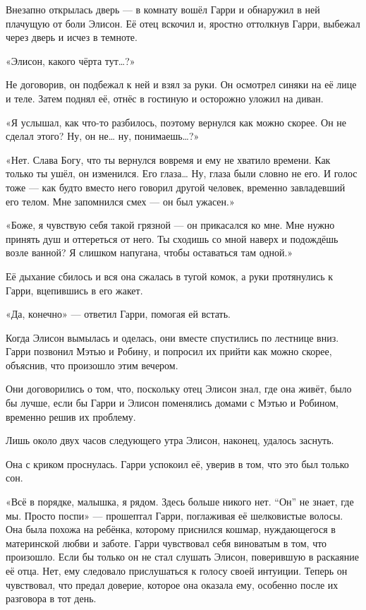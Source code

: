 \documentclass[a5paper, 9pt,
final, openany, twoside=true]{memoir}
\begin{document}
Внезапно открылась дверь — в комнату вошёл Гарри и обнаружил в ней плачущую от боли Элисон. Её отец вскочил и, яростно оттолкнув Гарри, выбежал через дверь и исчез в темноте.

«Элисон, какого чёрта тут…?»

Не договорив, он подбежал к ней и взял за руки. Он осмотрел синяки на её лице и теле. Затем поднял её, отнёс в гостиную и осторожно уложил на диван.

«Я услышал, как что-то разбилось, поэтому вернулся как можно скорее. Он не сделал этого? Ну, он не… ну, понимаешь…?»

«Нет. Слава Богу, что ты вернулся вовремя и ему не хватило времени. Как только ты ушёл, он изменился. Его глаза… Ну, глаза были словно не его. И голос тоже — как будто вместо него говорил другой человек, временно завладевший его телом. Мне запомнился смех — он был ужасен.»

«Боже, я чувствую себя такой грязной — он прикасался ко мне. Мне нужно принять душ и оттереться от него. Ты сходишь со мной наверх и подождёшь возле ванной? Я слишком напугана, чтобы оставаться там одной.»

Её дыхание сбилось и вся она сжалась в тугой комок, а руки протянулись к Гарри, вцепившись в его жакет.

«Да, конечно» — ответил Гарри, помогая ей встать.\bigskip

Когда Элисон вымылась и оделась, они вместе спустились по лестнице вниз. Гарри позвонил Мэтью и Робину, и попросил их прийти как можно скорее, объяснив, что произошло этим вечером.

Они договорились о том, что, поскольку отец Элисон знал, где она живёт, было бы лучше, если бы Гарри и Элисон поменялись домами с Мэтью и Робином, временно решив их проблему.

Лишь около двух часов следующего утра Элисон, наконец, удалось заснуть.\bigskip

Она с криком проснулась. Гарри успокоил её, уверив в том, что это был только сон.

«Всё в порядке, малышка, я рядом. Здесь больше никого нет. ``Он'' не знает, где мы. Просто поспи» — прошептал Гарри, поглаживая её шелковистые волосы. Она была похожа на ребёнка, которому приснился кошмар, нуждающегося в материнской любви и заботе. Гарри чувствовал себя виноватым в том, что произошло. Если бы только он не стал слушать Элисон, поверившую в раскаяние её отца. Нет, ему следовало прислушаться к голосу своей интуиции. Теперь он чувствовал, что предал доверие, которое она оказала ему, особенно после их разговора в тот день.
\end{document}
